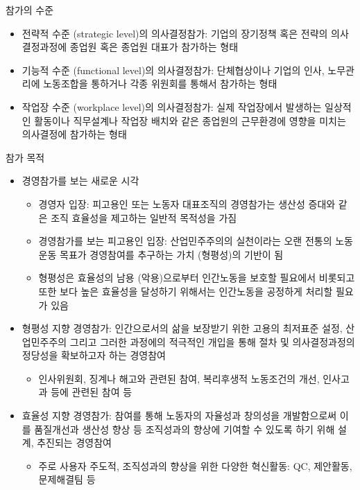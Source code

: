 \documentclass[aspectratio=169,xcolor=dvipsnames,handout]{beamer}
\begin{document}
\begin{frame}{참가의 수준}
    \begin{itemize}[<+->]
        \item 전략적 수준 (strategic level)의 의사결정참가: 기업의 장기정책 혹은 전략의 의사결정과정에 종업원 혹은 종업원 대표가 참가하는 형태
        \item 기능적 수준 (functional level)의 의사결정참가: 단체협상이나 기업의 인사, 노무관리에 노동조합을 통하거나 각종 위원회를 통해서 참가하는 형태
        \item 작업장 수준 (workplace level)의 의사결정참가: 실제 작업장에서 발생하는 일상적인 활동이나 직무설계나 작업장 배치와 같은 종업원의 근무환경에 영향을 미치는 의사결정에 참가하는 형태
    \end{itemize}
\end{frame}

\begin{frame}[allowframebreaks]{참가 목적}
    \begin{itemize}[<+->]
        \item 경영참가를 보는 새로운 시각
        \begin{itemize}[<+->]
            \item 경영자 입장: 피고용인 또는 노동자 대표조직의 경영참가는 생산성 증대와 같은 조직 효율성을 제고하는 일반적 목적성을 가짐
            \item 경영참가를 보는 피고용인 입장: 산업민주주의의 실천이라는 오랜 전통의 노동운동 목표가 경영참여를 추구하는 가치 (형평성)의 기반이 됨
            \item 형평성은 효율성의 남용 (악용)으로부터 인간노동을 보호할 필요에서 비롯되고 또한 보다 높은 효율성을 달성하기 위해서는 인간노동을 공정하게 처리할 필요가 있음
        \end{itemize}
        \framebreak\relax
        \item 형평성 지향 경영참가: 인간으로서의 삶을 보장받기 위한 고용의 최저표준 설정, 산업민주주의 그리고 그러한 과정에의 적극적인 개입을 통해 절차 및 의사결정과정의 정당성을 확보하고자 하는 경영참여
        \begin{itemize}[<+->]
            \item 인사위원회, 징계나 해고와 관련된 참여, 복리후생적 노동조건의 개선, 인사고과 등에 관련된 참여 등
        \end{itemize}
        \item 효율성 지향 경영참가: 참여를 통해 노동자의 자율성과 창의성을 개발함으로써 이를 품질개선과 생산성 향상 등 조직성과의 향상에 기여할 수 있도록 하기 위해 설계, 추진되는 경영참여
        \begin{itemize}[<+->]
            \item 주로 사용자 주도적, 조직성과의 향상을 위한 다양한 혁신활동: QC, 제안활동, 문제해결팀 등
        \end{itemize}
    \end{itemize}
\end{frame}


\end{document}
